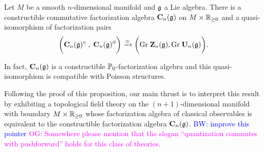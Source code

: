 \documentclass[11pt]{amsart}
\numberwithin{equation}{section}
\def\brian{\textcolor{blue}{BW: }\textcolor{blue}}
\def\owen{\textcolor{magenta}{OG: }\textcolor{magenta}}
\begin{document}

\begin{prp}
\label{prp:pair}
Let $M$ be a smooth $n$-dimensional manifold and $\mathfrak g$ a Lie algebra. 
There is a constructible commutative factorization algebra ${\bf C}_n (\mathfrak g)$
on $M \times \mathbb R_{\geq 0}$ and a quasi-isomorphism of factorization pairs
\[
\bigg( {\bf C}_n (\mathfrak g)^\circ \; , \; {\bf C}_n (\mathfrak g)^\partial \bigg) \xrightarrow{\simeq} \bigg({\rm Gr} \; \mathbf Z_n(\mathfrak g), {\rm Gr} \; \mathbf U_n(\mathfrak g) \bigg).
\]

In fact, $\mathbf C_n(\mathfrak g)$ is a constructible $\mathbb P_0$-factorization algebra and this quasi-isomorphism is compatible with Poisson structures.
\end{prp}


Following the proof of this proposition, our main thrust is to interpret this result by exhibiting a topological field theory on the $(n+1)$-dimensional manifold with boundary $M \times \mathbb R_{\geq 0}$ whose factorization algebra of classical observables is equivalent to the constructible factorization algebra $\mathbf C_n(\mathfrak g)$. 
\brian{improve this pointer}
\owen{Somewhere please mention that the slogan ``quantization commutes with pushforward'' holds for this class of theories.}

%


\end{document}
